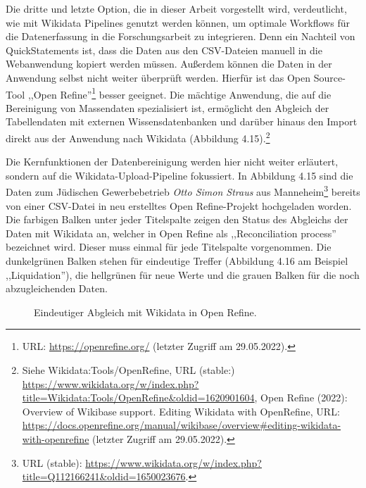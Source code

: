 Die dritte und letzte Option, die in dieser Arbeit vorgestellt wird, verdeutlicht, wie mit Wikidata Pipelines genutzt werden können, um optimale Workflows für die Datenerfassung in die Forschungsarbeit zu integrieren. Denn ein Nachteil von QuickStatements ist, dass die Daten aus den CSV-Dateien manuell in die Webanwendung kopiert werden müssen. Außerdem können die Daten in der Anwendung selbst nicht weiter überprüft werden. Hierfür ist das Open Source-Tool ,,Open Refine''\footnote{URL: \url{https://openrefine.org/} (letzter Zugriff am 29.05.2022).} besser geeignet. Die mächtige Anwendung, die auf die Bereinigung von Massendaten spezialisiert ist, ermöglicht den Abgleich der Tabellendaten mit externen Wissensdatenbanken und darüber hinaus den Import direkt aus der Anwendung nach Wikidata (Abbildung 4.15).\footnote{Siehe Wikidata:Tools/OpenRefine, URL (stable:) \url{https://www.wikidata.org/w/index.php?title=Wikidata:Tools/OpenRefine\&oldid=1620901604}, Open Refine (2022): Overview of Wikibase support. Editing Wikidata with OpenRefine, URL: \url{https://docs.openrefine.org/manual/wikibase/overview\#editing-wikidata-with-openrefine} (letzter Zugriff am 29.05.2022).}

Die Kernfunktionen der Datenbereinigung werden hier nicht weiter erläutert, sondern auf die Wikidata-Upload-Pipeline fokussiert. In Abbildung 4.15 sind die Daten zum Jüdischen Gewerbebetrieb \textit{Otto Simon Straus} aus Manneheim\footnote{URL (stable): \url{https://www.wikidata.org/w/index.php?title=Q112166241\&oldid=1650023676}.} bereits von einer CSV-Datei in neu erstelltes Open Refine-Projekt hochgeladen worden. Die farbigen Balken unter jeder Titelspalte zeigen den Status des Abgleichs der Daten mit Wikidata an, welcher in Open Refine als ,,Reconciliation process'' bezeichnet wird. Dieser muss einmal für jede Titelspalte vorgenommen. Die dunkelgrünen Balken stehen für eindeutige Treffer (Abbildung 4.16 am Beispiel ,,Liquidation''), die hellgrünen für neue Werte und die grauen Balken für die noch abzugleichenden Daten. 

\begin{figure}[h]
    \centering
    \caption{Eindeutiger Abgleich mit Wikidata in Open Refine.}
    \label{fig:x cubed graph}
\end{figure}

